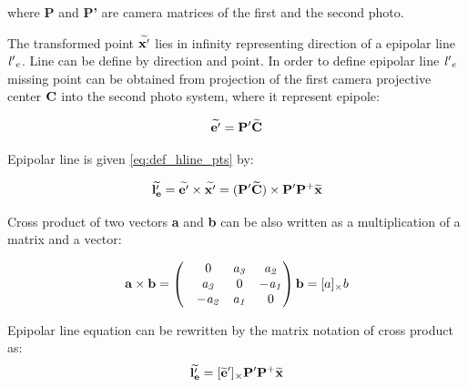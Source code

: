 \documentclass[a4paper,12pt]{article}
\newcommand{\ematr}[1]{
{\bf #1}
}
\newcommand{\evect}[1]{
{\bf #1}
}
\newcommand{\ehvect}[1]{
{\bf \widetilde{#1}}
}
\newcommand{\escal}[1]{
{\it #1}
}
\begin{document}
where \ematr{P} and \ematr{P'} are camera matrices of the first and the second photo.

The transformed point $\ehvect{x'}$ lies in infinity 
representing direction of a epipolar line $\escal{l'}_{e}$. Line can be define by direction 
and point. In order to define epipolar line $\escal{l'}_{e}$ missing point can be obtained from 
projection of the first camera projective center $\evect{C}$ into the second photo system, where it represent
epipole:

\begin{equation}
\ehvect{e'} =  \ematr{P'}\ehvect{C} \\
\end{equation}





Epipolar line is given \eqref{eq:def_hline_pts} by:

\begin{equation}
\ehvect{l'_{e}} =  \ehvect{e'} \times \ehvect{x'} = (\ematr{P'}\ehvect{C}) \times \ematr{P'}\ematr{P}^{+}\ehvect{x}
\end{equation}

Cross product of two vectors \evect{a} and \evect{b} can be also written as a multiplication of a matrix and a vector:

\begin{equation}
\evect{a}  \times \evect{b}  = 
\begin{pmatrix}
   & 0      & \escal{a_{3}}   & \escal{a_{2}}\\
   & \escal{a_{3}}  & 0               & \escal{-a_{1}}\\
   & \escal{-a_{2}} & \escal{a_{1}}   & 0\\
\end{pmatrix}
\evect{b} = [a]_{\times} b
\end{equation}

Epipolar line equation can be rewritten by the matrix notation of cross product as:
\begin{equation}
\ehvect{l'_{e}}  = [\ehvect{e}']_{\times} \ematr{P'}\ematr{P}^{+}\ehvect{x}
\end{equation}
\end{document}

